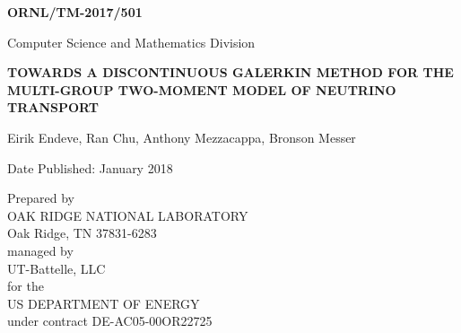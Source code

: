 \documentclass[11pt,letterpaper,twoside,english,final]{article}
\begin{document}
\newpage

\begin{titlepage}

\begin{flushright}{\textsf{\bfseries{\large{ORNL/TM-2017/501}}}}\\ 
\end{flushright}

\vspace{0.5in}

\begin{center}
Computer Science and Mathematics Division
\end{center}

\vspace{1.25in}

\begin{center}
{\bf{\large{TOWARDS A DISCONTINUOUS GALERKIN METHOD FOR THE MULTI-GROUP TWO-MOMENT MODEL OF NEUTRINO TRANSPORT}}}\\
\vspace{0.5in}

Eirik Endeve, Ran Chu, Anthony Mezzacappa, Bronson Messer

\vspace{1.35in}

Date Published: January 2018

\vspace{1.35in}

Prepared by \\
OAK RIDGE NATIONAL LABORATORY \\
Oak Ridge, TN 37831-6283 \\
managed by \\
UT-Battelle, LLC \\
for the \\
US DEPARTMENT OF ENERGY \\
under contract DE-AC05-00OR22725

\end{center}

\end{titlepage}


\clearemptydoublepage 
\begin{centering}
\tableofcontents 
\end{centering}

\end{document}
